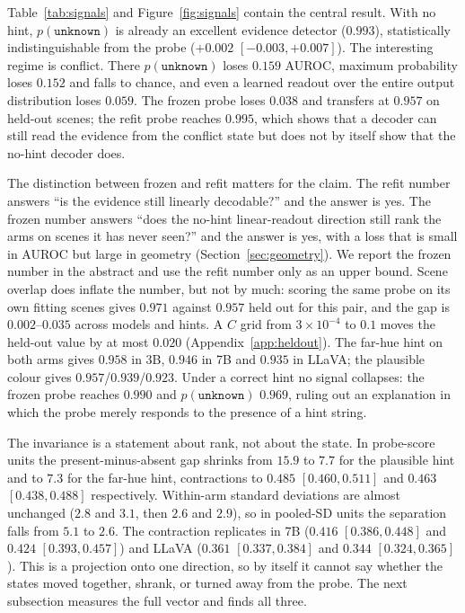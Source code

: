 \documentclass[10pt]{article}
\newcommand{\unknown}{\texttt{unknown}}
\newcommand{\punk}{p(\unknown)}
\begin{document}
Table~\ref{tab:signals} and Figure~\ref{fig:signals} contain the central result. With no hint, $\punk$ is already an excellent evidence detector ($0.993$), statistically indistinguishable from the probe ($+0.002$ $[-0.003,+0.007]$). The interesting regime is conflict. There $\punk$ loses $0.159$ AUROC, maximum probability loses $0.152$ and falls to chance, and even a learned readout over the entire output distribution loses $0.059$. The frozen probe loses $0.038$ and transfers at $0.957$ on held-out scenes; the refit probe reaches $0.995$, which shows that a decoder can still read the evidence from the conflict state but does not by itself show that the no-hint decoder does.

The distinction between frozen and refit matters for the claim. The refit number answers ``is the evidence still linearly decodable?'' and the answer is yes. The frozen number answers ``does the no-hint linear-readout direction still rank the arms on scenes it has never seen?'' and the answer is yes, with a loss that is small in AUROC but large in geometry (Section~\ref{sec:geometry}). We report the frozen number in the abstract and use the refit number only as an upper bound. Scene overlap does inflate the number, but not by much: scoring the same probe on its own fitting scenes gives $0.971$ against $0.957$ held out for this pair, and the gap is $0.002$--$0.035$ across models and hints. A $C$ grid from $3\times10^{-4}$ to $0.1$ moves the held-out value by at most $0.020$ (Appendix~\ref{app:heldout}). The far-hue hint on both arms gives $0.958$ in 3B, $0.946$ in 7B and $0.935$ in LLaVA; the plausible colour gives $0.957$/$0.939$/$0.923$. Under a correct hint no signal collapses: the frozen probe reaches $0.990$ and $\punk$ $0.969$, ruling out an explanation in which the probe merely responds to the presence of a hint string.

The invariance is a statement about rank, not about the state. In probe-score units the present-minus-absent gap shrinks from $15.9$ to $7.7$ for the plausible hint and to $7.3$ for the far-hue hint, contractions to $0.485$ $[0.460,0.511]$ and $0.463$ $[0.438,0.488]$ respectively. Within-arm standard deviations are almost unchanged ($2.8$ and $3.1$, then $2.6$ and $2.9$), so in pooled-SD units the separation falls from $5.1$ to $2.6$. The contraction replicates in 7B ($0.416$ $[0.386,0.448]$ and $0.424$ $[0.393,0.457]$) and LLaVA ($0.361$ $[0.337,0.384]$ and $0.344$ $[0.324,0.365]$). This is a projection onto one direction, so by itself it cannot say whether the states moved together, shrank, or turned away from the probe. The next subsection measures the full vector and finds all three.
\end{document}
